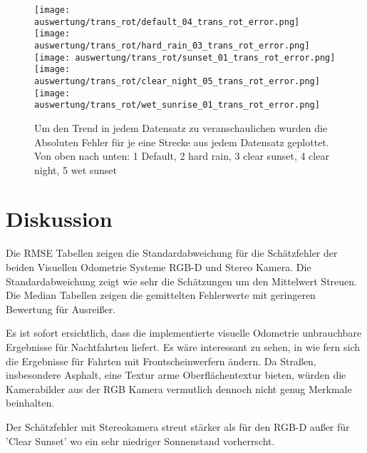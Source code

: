 \begin{figure}[!ht]
	\texttt{[image: auswertung/trans\_rot/default\_04\_trans\_rot\_error.png]}\hfill
	\texttt{[image: auswertung/trans\_rot/hard\_rain\_03\_trans\_rot\_error.png]}\hfill
	\texttt{[image: auswertung/trans\_rot/sunset\_01\_trans\_rot\_error.png]}
	\hfill
	\texttt{[image: auswertung/trans\_rot/clear\_night\_05\_trans\_rot\_error.png]}\hfill
	\texttt{[image: auswertung/trans\_rot/wet\_sunrise\_01\_trans\_rot\_error.png]}\hfill
	\caption[Boxplots Absoluter Fehler von Streckenabschnitten]{Um den Trend in jedem Datensatz zu veranschaulichen wurden die Absoluten Fehler für je eine Strecke aus jedem Datensatz geplottet. Von oben nach unten: 1 Default, 2 hard rain, 3 clear sunset, 4 clear night, 5 wet sunset}
\end{figure}

\clearpage
\newpage

\begin{center}
			
\end{center}
\newpage
\begin{center}
			
\end{center}

\newpage
\clearpage
\newpage

\section{Diskussion}
Die RMSE Tabellen zeigen die Standardabweichung für die Schätzfehler der beiden Visuellen Odometrie Systeme RGB-D und Stereo Kamera. Die Standardabweichung zeigt wie sehr die Schätzungen um den Mittelwert Streuen. Die Median Tabellen zeigen die gemittelten Fehlerwerte mit geringeren Bewertung für Ausrei{\ss}er.
\newline 

Es ist sofort ersichtlich, dass die implementierte visuelle Odometrie unbrauchbare Ergebnisse für Nachtfahrten liefert. Es wäre interessant zu sehen, in wie fern sich die Ergebnisse für Fahrten mit Frontscheinwerfern ändern. Da Stra{\ss}en, insbesondere Asphalt, eine Textur arme Oberflächentextur bieten, würden die Kamerabilder aus der RGB Kamera vermutlich dennoch nicht genug Merkmale beinhalten.   
\newline 

Der Schätzfehler mit Stereokamera streut stärker als für den RGB-D au{\ss}er für 'Clear Sunset' wo ein sehr niedriger Sonnenstand vorherrscht.  
\newline

